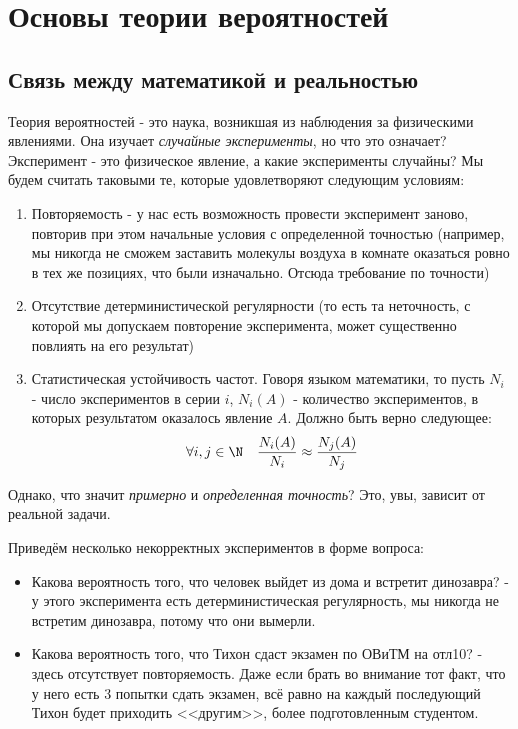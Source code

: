 \section{Основы теории вероятностей}

\subsection{Связь между математикой и реальностью}

\begin{note}
	Теория вероятностей - это наука, возникшая из наблюдения за физическими явлениями. Она изучает \textit{случайные эксперименты}, но что это означает? Эксперимент - это физическое явление, а какие эксперименты случайны? Мы будем считать таковыми те, которые удовлетворяют следующим условиям:
	\begin{enumerate}
		\item Повторяемость - у нас есть возможность провести эксперимент заново, повторив при этом начальные условия с определенной точностью (например, мы никогда не сможем заставить молекулы воздуха в комнате оказаться ровно в тех же позициях, что были изначально. Отсюда требование по точности) 
		
		\item Отсутствие детерминистической регулярности (то есть та неточность, с которой мы допускаем повторение эксперимента, может существенно повлиять на его результат)
		
		\item Статистическая устойчивость частот. Говоря языком математики, то пусть $N_i$ - число экспериментов в серии $i$, $N_i(A)$ - количество экспериментов, в которых результатом оказалось явление $A$. Должно быть верно следующее:
		\[
			\forall i, j \in \N \quad \frac{N_i(A)}{N_i} \approx \frac{N_j(A)}{N_j} 
		\]
	\end{enumerate}
	Однако, что значит \textit{примерно} и \textit{определенная точность}? Это, увы, зависит от реальной задачи.
\end{note}

\begin{example}
	Приведём несколько некорректных экспериментов в форме вопроса:
	\begin{itemize}
		\item Какова вероятность того, что человек выйдет из дома и встретит динозавра? - у этого эксперимента есть детерминистическая регулярность, мы никогда не встретим динозавра, потому что они вымерли.
		
		\item Какова вероятность того, что Тихон сдаст экзамен по ОВиТМ на отл10? - здесь отсутствует повторяемость. Даже если брать во внимание тот факт, что у него есть 3 попытки сдать экзамен, всё равно на каждый последующий Тихон будет приходить <<другим>>, более подготовленным студентом.
	\end{itemize}
\end{example}

